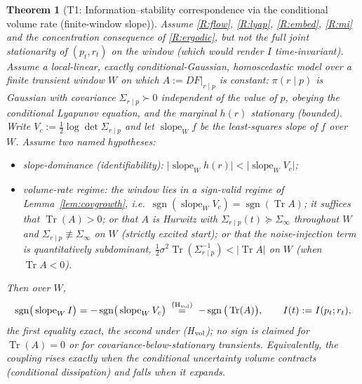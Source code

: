 \documentclass[11pt]{article}
\theoremstyle{plain}
\newtheorem{theorem}{Theorem}[section]
\theoremstyle{definition}
\theoremstyle{remark}
\begin{document}
\begin{theorem}[T1: Information--stability correspondence via the conditional volume rate (finite-window slope)]\label{thm:t1}
Assume \ref{R:flow}, \ref{R:lyap}, \ref{R:embed}, \ref{R:mi} and the concentration consequence of \ref{R:ergodic}, but \emph{not} the full joint stationarity of $(p_t,r_t)$ on the window (which would render $I$ time-invariant). Assume a \emph{local-linear, exactly conditional-Gaussian, homoscedastic} model over a finite transient window $W$ on which $A:=DF|_{r\mid p}$ is constant: $\pi(r\mid p)$ is Gaussian with covariance $\Sigma_{r\mid p}\succ0$ \emph{independent of the value of $p$}, obeying the conditional Lyapunov equation, and the marginal $h(r)$ stationary (bounded). Write $V_c:=\tfrac12\log\det\Sigma_{r\mid p}$ and let $\operatorname{slope}_W f$ be the least-squares slope of $f$ over $W$. Assume two named hypotheses:
\begin{itemize}[leftmargin=2.4em]
\item[\textnormal{(D)}] \emph{slope-dominance (identifiability):} $\big|\operatorname{slope}_W h(r)\big|<\big|\operatorname{slope}_W V_c\big|$;
\item[\textnormal{(H$_{\rm vol}$)}] \emph{volume-rate regime:} the window lies in a sign-valid regime of Lemma~\ref{lem:covgrowth}, i.e.\ $\operatorname{sgn}(\operatorname{slope}_W V_c)=\operatorname{sgn}(\operatorname{Tr}A)$; it suffices that $\operatorname{Tr}(A)>0$; or that $A$ is Hurwitz with $\Sigma_{r\mid p}(t)\succeq\Sigma_\infty$ throughout $W$ and $\Sigma_{r\mid p}\not\equiv\Sigma_\infty$ on $W$ (strictly excited start); or that the noise-injection term is quantitatively subdominant, $\tfrac12\sigma^2\operatorname{Tr}(\Sigma_{r\mid p}^{-1})<|\operatorname{Tr}A|$ on $W$ (when $\operatorname{Tr}A<0$).
\end{itemize}
Then over $W$,
\[
\operatorname{sgn}\!\big(\operatorname{slope}_W I\big)=-\operatorname{sgn}\!\big(\operatorname{slope}_W V_c\big)\;\overset{\textnormal{(H$_{\rm vol}$)}}{=}\;-\operatorname{sgn}\big(\operatorname{Tr}(A)\big),\qquad I(t):=I(p_t;r_t),
\]
the first equality exact, the second under (H$_{\rm vol}$); no sign is claimed for $\operatorname{Tr}(A)=0$ or for covariance-below-stationary transients. Equivalently, the coupling rises exactly when the conditional uncertainty volume contracts (conditional dissipation) and falls when it expands.
\end{theorem}
\end{document}
